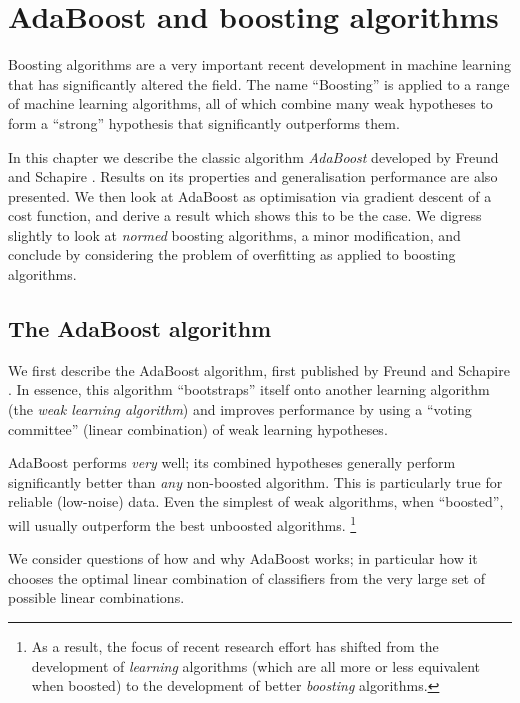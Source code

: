 

\chapter{AdaBoost and boosting algorithms}
\label{chapter:boosting}

Boosting algorithms are a very important recent development in machine
learning that has significantly altered the field.  The name
``Boosting'' is applied to a range of  machine learning algorithms,
all of which combine many weak hypotheses to form a ``strong''
hypothesis that significantly outperforms them. 

In this chapter we describe the classic algorithm \emph{AdaBoost}
developed by Freund and Schapire \cite{Freund96}.  Results on its
properties and generalisation performance are also presented.  We then
look at AdaBoost as optimisation via gradient descent of a cost
function, and derive a result which shows this to be the case.  We
digress slightly to look at \emph{normed} boosting algorithms, a minor
modification, and conclude by considering the problem of overfitting
as applied to boosting algorithms.

\section{The AdaBoost algorithm}

We first describe the AdaBoost algorithm, first published by Freund
and Schapire \cite{Freund96}.  In essence, this algorithm
``bootstraps'' itself onto another learning algorithm (the \emph{weak
learning algorithm}) and improves performance by using a ``voting
committee'' (linear combination) of weak learning hypotheses.

AdaBoost performs \emph{very} well; its combined hypotheses generally
perform significantly better than \emph{any} non-boosted algorithm.
This is particularly true for reliable (low-noise) data.  Even
the simplest of weak algorithms, when ``boosted'', will usually
outperform the best unboosted algorithms.
\footnote{As a result, the focus of recent research effort has shifted
from the development of \emph{learning} algorithms (which are all more 
or less equivalent when boosted) to the development of better
\emph{boosting} algorithms.}

We consider questions of how and why AdaBoost works; in
particular how it chooses the optimal linear combination of
classifiers from the very large set of possible linear combinations.

